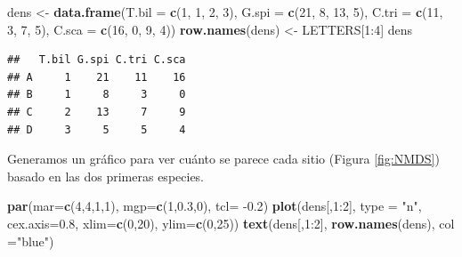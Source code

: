 \documentclass[]{book}
\newenvironment{Shaded}{\begin{snugshade}}{\end{snugshade}}
\newcommand{\KeywordTok}[1]{\textcolor[rgb]{0.13,0.29,0.53}{\textbf{{#1}}}}
\newcommand{\DataTypeTok}[1]{\textcolor[rgb]{0.13,0.29,0.53}{{#1}}}
\newcommand{\DecValTok}[1]{\textcolor[rgb]{0.00,0.00,0.81}{{#1}}}
\newcommand{\FloatTok}[1]{\textcolor[rgb]{0.00,0.00,0.81}{{#1}}}
\newcommand{\StringTok}[1]{\textcolor[rgb]{0.31,0.60,0.02}{{#1}}}
\newcommand{\NormalTok}[1]{{#1}}
\begin{document}
\begin{Shaded}
\begin{Highlighting}[]
\NormalTok{dens <-}\StringTok{ }\KeywordTok{data.frame}\NormalTok{(}\DataTypeTok{T.bil =} \KeywordTok{c}\NormalTok{(}\DecValTok{1}\NormalTok{, }\DecValTok{1}\NormalTok{, }\DecValTok{2}\NormalTok{, }\DecValTok{3}\NormalTok{), }\DataTypeTok{G.spi =} \KeywordTok{c}\NormalTok{(}\DecValTok{21}\NormalTok{, }\DecValTok{8}\NormalTok{, }\DecValTok{13}\NormalTok{, }\DecValTok{5}\NormalTok{),}
                   \DataTypeTok{C.tri =} \KeywordTok{c}\NormalTok{(}\DecValTok{11}\NormalTok{, }\DecValTok{3}\NormalTok{, }\DecValTok{7}\NormalTok{, }\DecValTok{5}\NormalTok{), }\DataTypeTok{C.sca =} \KeywordTok{c}\NormalTok{(}\DecValTok{16}\NormalTok{, }\DecValTok{0}\NormalTok{, }\DecValTok{9}\NormalTok{, }\DecValTok{4}\NormalTok{))}
\KeywordTok{row.names}\NormalTok{(dens) <-}\StringTok{ }\NormalTok{LETTERS[}\DecValTok{1}\NormalTok{:}\DecValTok{4}\NormalTok{]}
\NormalTok{dens}
\end{Highlighting}
\end{Shaded}

\begin{verbatim}
##   T.bil G.spi C.tri C.sca
## A     1    21    11    16
## B     1     8     3     0
## C     2    13     7     9
## D     3     5     5     4
\end{verbatim}

Generamos un gráfico para ver cuánto se parece cada sitio (Figura
\ref{fig:NMDS}) basado en las dos primeras especies.

\begin{Shaded}
\begin{Highlighting}[]
\KeywordTok{par}\NormalTok{(}\DataTypeTok{mar=}\KeywordTok{c}\NormalTok{(}\DecValTok{4}\NormalTok{,}\DecValTok{4}\NormalTok{,}\DecValTok{1}\NormalTok{,}\DecValTok{1}\NormalTok{), }\DataTypeTok{mgp=}\KeywordTok{c}\NormalTok{(}\DecValTok{1}\NormalTok{,}\FloatTok{0.3}\NormalTok{,}\DecValTok{0}\NormalTok{), }\DataTypeTok{tcl=} \NormalTok{-}\FloatTok{0.2}\NormalTok{)}
\KeywordTok{plot}\NormalTok{(dens[,}\DecValTok{1}\NormalTok{:}\DecValTok{2}\NormalTok{], }\DataTypeTok{type =} \StringTok{"n"}\NormalTok{, }\DataTypeTok{cex.axis=}\FloatTok{0.8}\NormalTok{, }\DataTypeTok{xlim=}\KeywordTok{c}\NormalTok{(}\DecValTok{0}\NormalTok{,}\DecValTok{20}\NormalTok{), }\DataTypeTok{ylim=}\KeywordTok{c}\NormalTok{(}\DecValTok{0}\NormalTok{,}\DecValTok{25}\NormalTok{)) }
\KeywordTok{text}\NormalTok{(dens[,}\DecValTok{1}\NormalTok{:}\DecValTok{2}\NormalTok{], }\KeywordTok{row.names}\NormalTok{(dens), }\DataTypeTok{col =}\StringTok{"blue"}\NormalTok{)}
\end{Highlighting}
\end{Shaded}
\end{document}
